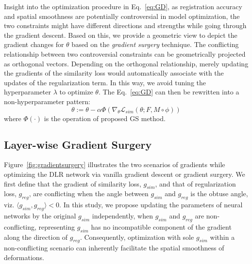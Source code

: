 \documentclass[runningheads]{llncs}
\begin{document}
Insight into the optimization procedure in Eq.~\ref{eq:GD}, as registration accuracy and spatial smoothness are potentially controversial in model optimization, the two constraints might have different directions and strengths while going through the gradient descent. 
Based on this, we provide a geometric view to depict the gradient changes for $\theta$ based on the \textit{gradient surgery} technique. The conflicting relationship between two controversial constraints can be geometrically projected as orthogonal vectors. Depending on the orthogonal relationship, merely updating the gradients of the similarity loss would automatically associate with the updates of the regularization term. In this way, we avoid tuning the hyperparameter $\lambda$ to optimize $\theta$.
The Eq.~\ref{eq:GD} can then be rewritten into a non-hyperparameter pattern:
\begin{equation}
    \theta := \theta - \alpha \Phi ( \nabla_\theta \mathcal{L}_{sim}(\theta; F, M \circ \phi) )
\end{equation}
where $\Phi(\cdot)$ is the operation of proposed GS method.

\subsection{Layer-wise Gradient Surgery}
Figure~\ref{fig:gradientsurgery} illustrates the two scenarios of gradients while optimizing the DLR network via vanilla gradient descent or gradient surgery. We first define that the gradient of similarity loss, $g_{sim}$, and that of regularization loss, $g_{reg}$, are conflicting when the angle between $g_{sim}$ and $g_{reg}$ is the obtuse angle, viz. $\langle g_{sim}, g_{reg} \rangle < 0$. In this study, we propose updating the parameters of neural networks by the original $g_{sim}$ independently, when $g_{sim}$ and $g_{reg}$ are non-conflicting, representing $g_{sim}$ has no incompatible component of the gradient along the direction of $g_{reg}$. Consequently, optimization with sole $g_{sim}$ within a non-conflicting scenario can inherently facilitate the spatial smoothness of deformations.
\end{document}
